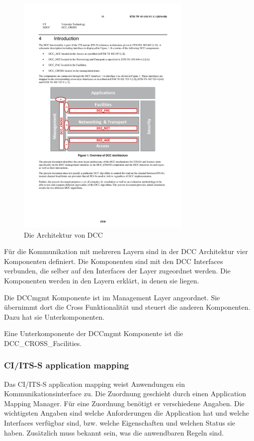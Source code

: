 \begin{figure}
	\includegraphics[width=0.75\textwidth]{content/images/02_architektur/dccArchitektur.pdf}
	\caption{Die Architektur von DCC \cite{etsi102687}}
	\label{fig:architektur_dccArchitektur}
\end{figure}

Für die Kommunikation mit mehreren Layern sind in der  \ac{DCC} Architektur vier Komponenten definiert. Die Komponenten sind mit den \ac{DCC} Interfaces verbunden, die selber auf den Interfaces der Layer zugeordnet werden. Die Komponenten werden in den Layern erklärt, in denen sie liegen. 

Die DCCmgmt Komponente ist im Management Layer angeordnet. Sie übernimmt dort die Cross Funktionalität und steuert die anderen Komponenten. Dazu hat sie Unterkomponenten.

Eine Unterkomponente der DCCmgmt Komponente ist die DCC\_CROSS\_Facilities. 



\subsubsection{CI/ITS-S application mapping}
Das CI/ITS-S application mapping weist Anwendungen ein Kommunikationsinterface zu. Die Zuordnung geschieht durch einen Application Mapping Manager. Für eine  Zuordnung benötigt er verschiedene Angaben. Die wichtigsten Angaben sind welche Anforderungen die Application hat und welche Interfaces verfügbar sind, bzw. welche Eigenschaften und welchen Status sie haben. Zusätzlich muss bekannt sein, was die anwendbaren Regeln sind. 


